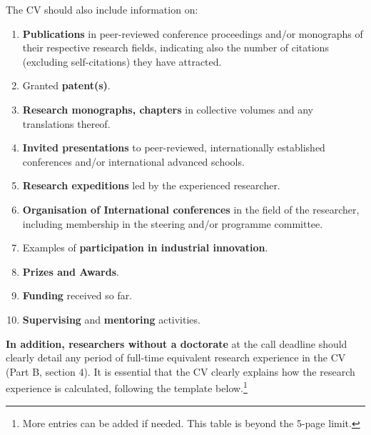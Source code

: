 \medskip\noindent
The CV should also include information on:
\begin{enumerate}
  \item \textbf{Publications} in peer-reviewed conference
  proceedings and/or monographs of their respective research
  fields, indicating also the number of citations (excluding
  self-citations) they have attracted.

  \item Granted \textbf{patent(s)}.

  \item \textbf{Research monographs, chapters} in collective
  volumes and any translations thereof.

  \item \textbf{Invited presentations} to peer-reviewed,
  internationally established conferences and/or international
  advanced schools.

  \item \textbf{Research expeditions} led by the experienced
  researcher.

  \item \textbf{Organisation of International conferences} in the
  field of the researcher, including membership in the steering
  and/or programme committee.

  \item Examples of \textbf{participation in industrial innovation}.

  \item \textbf{Prizes and Awards}.

  \item \textbf{Funding} received so far.

  \item \textbf{Supervising} and \textbf{mentoring} activities.
\end{enumerate}

\textbf{In addition, researchers without a doctorate} at the call
deadline should clearly detail any period of full-time equivalent
research experience in the CV (Part B, section 4). It is essential
that the CV clearly explains how the research experience is
calculated, following the template below.\footnote{More entries
can be added if needed. This table is beyond the 5-page limit.}

